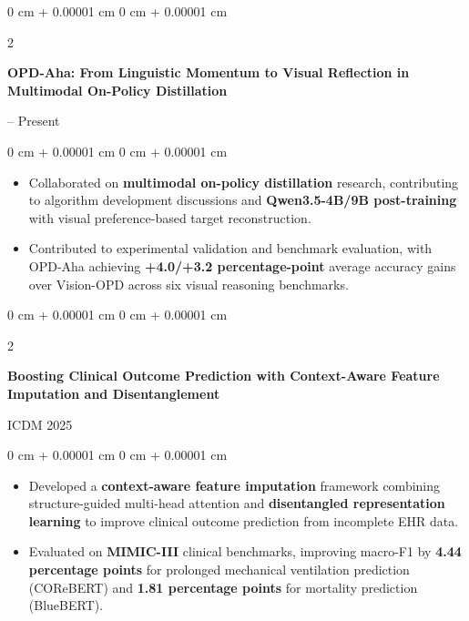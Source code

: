 \documentclass[10pt, letterpaper]{article}
\newenvironment{highlights}{
    \begin{itemize}[
        topsep=0.10 cm,
        parsep=0.10 cm,
        partopsep=0pt,
        itemsep=0pt,
        leftmargin=0 cm + 10pt
    ]
}{
    \end{itemize}
} %
\newenvironment{onecolentry}{
    \begin{adjustwidth}{
        0 cm + 0.00001 cm
    }{
        0 cm + 0.00001 cm
    }
}{
    \end{adjustwidth}
} %
\newenvironment{twocolentry}[2][]{
    \onecolentry
    \def\secondColumn{#2}
    \setcolumnwidth{\fill, 4.5 cm}
    \begin{paracol}{2}
}{
    \switchcolumn \raggedleft \secondColumn
    \end{paracol}
    \endonecolentry
} %
\begin{document}
\vspace{0.10 cm}

\begin{twocolentry}{
    2026 -- Present
}
    \textbf{OPD-Aha: From Linguistic Momentum to Visual Reflection in Multimodal On-Policy Distillation}
\end{twocolentry}

\vspace{0.05 cm}
\begin{onecolentry}
    \begin{highlights}
        \item Collaborated on \textbf{multimodal on-policy distillation} research, contributing to algorithm development discussions and \textbf{Qwen3.5-4B/9B post-training} with visual preference-based target reconstruction.

        \item Contributed to experimental validation and benchmark evaluation, with OPD-Aha achieving \textbf{+4.0/+3.2 percentage-point} average accuracy gains over Vision-OPD across six visual reasoning benchmarks.
    \end{highlights}
\end{onecolentry}

\vspace{0.10 cm}


\begin{twocolentry}{
    ICDM 2025
}
    \textbf{Boosting Clinical Outcome Prediction with Context-Aware Feature Imputation and Disentanglement}
\end{twocolentry}

\vspace{0.05 cm}
\begin{onecolentry}
    \begin{highlights}
        \item Developed a \textbf{context-aware feature imputation} framework combining structure-guided multi-head attention and \textbf{disentangled representation learning} to improve clinical outcome prediction from incomplete EHR data.

        \item Evaluated on \textbf{MIMIC-III} clinical benchmarks, improving macro-F1 by \textbf{4.44 percentage points} for prolonged mechanical ventilation prediction (COReBERT) and \textbf{1.81 percentage points} for mortality prediction (BlueBERT).
    \end{highlights}
\end{onecolentry}
\end{document}
